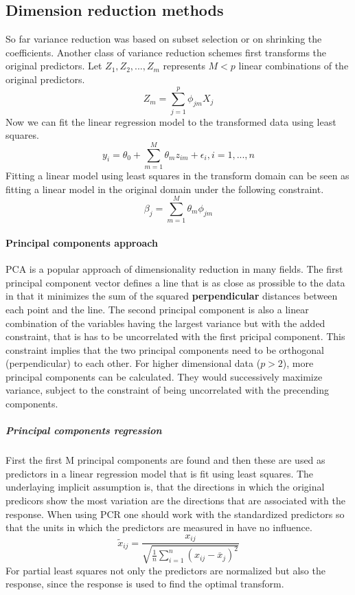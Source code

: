 \documentclass[../document.tex]{subfiles}
\begin{document}
	\subsection{Dimension reduction methods}
	So far variance reduction was based on subset selection or on shrinking the coefficients. Another class of variance reduction schemes first transforms the original predictors. Let \(Z_{1},Z_{2},...,Z_{m}\) represents \(M<p\) linear combinations of the original predictors.
	\begin{equation}
		Z_{m}=\sum_{j=1}^{p}\phi_{jm}X_{j}
	\end{equation}
	Now we can fit the linear regression model to the transformed data using least squares. 
	\begin{equation}
		y_{i}=\theta_{0}+\sum_{m=1}^{M}\theta_{m}z_{im}+\epsilon_{i}, i=1,...,n
	\end{equation}
	Fitting a linear model using least squares in the transform domain can be seen as fitting a linear model in the original domain under the following constraint.
	\begin{equation}
		\beta_{j}=\sum_{m=1}^{M}\theta_{m}\phi_{jm}
	\end{equation}
	\paragraph{Principal components approach}
	PCA is a popular approach of dimensionality reduction in many fields. The first principal component vector defines a line that is as close as prossible to the data in that it minimizes the sum of the squared \textbf{perpendicular} distances between each point and the line. The second principal component is also a linear combination of the variables having the largest variance but with the added constraint, that is has to be uncorrelated with the first pricipal component. This constraint implies that the two principal components need to be orthogonal (perpendicular) to each other. For higher dimensional data (\(p>2\)), more principal components can be calculated. They would successively maximize variance, subject to the constraint of being uncorrelated with the precending components. 
	\subparagraph{Principal components regression}
	First the first M principal components are found and then these are used as predictors in a linear regression model that is fit using least squares. The underlaying implicit assumption is, that the directions in which the original predicors show the most variation are the directions that are associated with the response. When using PCR one should work with the standardized predictors so that the units in which the predictors are measured in have no influence.
	\begin{equation}
		\tilde{x}_{ij}=\frac{x_{ij}}{\sqrt{\frac{1}{n}\sum_{i=1}^{n}(x_{ij}-\overline{x}_{j})^2}}
	\end{equation}
	For partial least squares not only the predictors are normalized but also the response, since the response is used to find the optimal transform.
\end{document}
